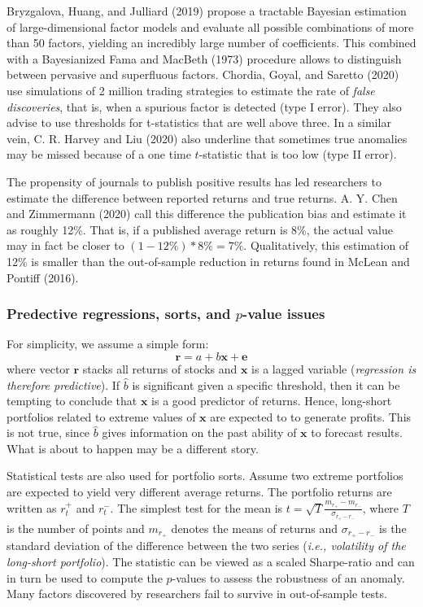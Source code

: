 Bryzgalova, Huang, and Julliard (2019) propose a tractable Bayesian estimation of large-dimensional factor models and evaluate all possible combinations of more than 50 factors, yielding an incredibly large number of coefficients. This combined with a Bayesianized Fama and MacBeth (1973) procedure allows to distinguish between pervasive and superfluous factors. Chordia, Goyal, and Saretto (2020) use simulations of 2 million trading strategies to estimate the rate of \textit{false discoveries}, that is, when a spurious factor is detected (type I error). They also advise to use thresholds for t-statistics that are well above three. In a similar vein, C. R. Harvey and Liu (2020) also underline that sometimes true anomalies may be missed because of a one time $t$-statistic that is too low (type II error).

The propensity of journals to publish positive results has led researchers to estimate the difference between reported returns and true returns. A. Y. Chen and Zimmermann (2020) call this difference the publication bias and estimate it as roughly 12\%. That is, if a published average return is 8\%, the actual value may in fact be closer to $(1-12\%)*8\%=7\%$. Qualitatively, this estimation of 12\% is smaller than the out-of-sample reduction in returns found in McLean and Pontiff (2016).

\subsubsection{Predective regressions, sorts, and $p$-value issues}
For simplicity, we assume a simple form:
\begin{equation}
    \mathbf{r} = a + b \mathbf{x} + \mathbf{e}
\end{equation}
where vector $\mathbf{r}$ stacks all returns of stocks and $\mathbf{x}$ is a lagged variable (\textit{regression is therefore predictive}). If $\hat{b}$ is significant given a specific threshold, then it can be tempting to conclude that $\mathbf{x}$ is a good predictor of returns. Hence, long-short portfolios related to extreme values of $\mathbf{x}$ are expected to to generate profits. This is not true, since $\hat{b}$ gives information on the past ability of $\mathbf{x}$ to forecast results. What is about to happen may be a different story.


Statistical tests are also used for portfolio sorts. Assume two extreme portfolios are expected to yield very different average returns. The portfolio returns are written as $r_{t}^{+}$ and $r_{t}^{-}$. The simplest test for the mean is $t = \sqrt{T}\frac{m_{r_{+}} - m_{r_{-}}}{\sigma_{r_{+} - r_{-}}}$, where $T$ is the number of points and $m_{r_{+}}$ denotes the means of returns and $\sigma _{r_{+} - r_{-}}$ is the standard deviation of the difference between the two series (\textit{i.e., volatility of the long-short portfolio}). The statistic can be viewed as a scaled Sharpe-ratio and can in turn be used to compute the $p$-values to assess the robustness of an anomaly. Many factors discovered by researchers fail to survive in out-of-sample tests.



